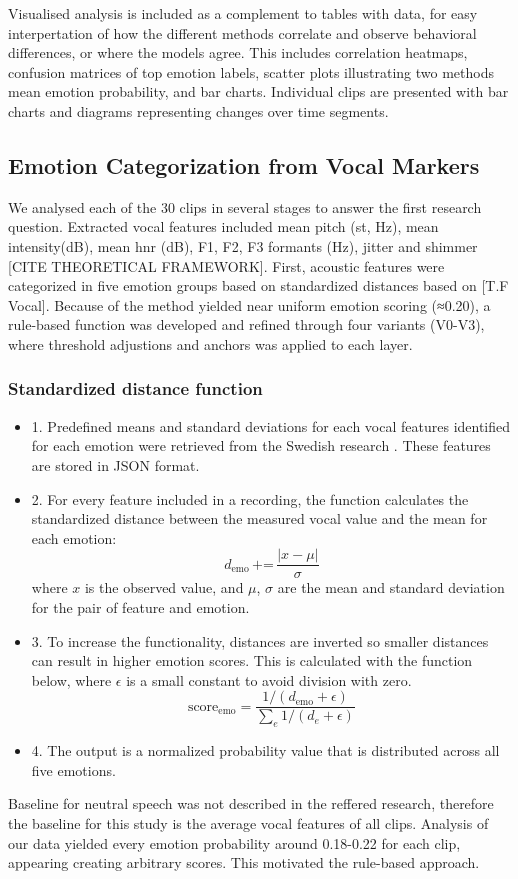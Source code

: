 Visualised analysis is included as a complement to tables with data, for easy interpertation of how the different methods correlate and observe behavioral differences, or where the models agree. 
This includes correlation heatmaps, confusion matrices of top emotion labels, scatter plots illustrating two methods mean emotion probability, and bar charts. 
Individual clips are presented with bar charts and diagrams representing changes over time segments. 



\subsection{Emotion Categorization from Vocal Markers}
We analysed each of the 30 clips in several stages to answer the first research question. Extracted vocal features included mean pitch (st, Hz), mean intensity(dB), mean hnr (dB), F1, F2, F3 formants (Hz), jitter and shimmer [CITE THEORETICAL FRAMEWORK].
First, acoustic features were categorized in five emotion groups based on standardized distances based on [T.F Vocal]. Because of the method yielded near uniform emotion scoring (≈0.20), a rule-based function was developed and refined through four variants (V0-V3), 
where threshold adjustions and anchors was applied to each layer.  

\subsubsection{Standardized distance function}
\label{sec:method-stand-func}
\begin{itemize}
    \item 1. Predefined means and standard deviations for each vocal features identified for each emotion were retrieved from the Swedish research \autocite{Ekberg2023}. These features are stored in JSON format. 
    \item 2. For every feature included in a recording, the function calculates the standardized distance between the measured vocal value and the mean for each emotion: 
    \[
    d_{\text{emo}} \, \text{+=} \, \frac{|x - \mu|}{\sigma}
    \]
    where \( x \) is the observed value, and \( \mu \), \( \sigma \) are the mean and standard deviation for the pair of feature and emotion.  
    \item 3. To increase the functionality, distances are inverted so smaller distances can result in higher emotion scores. 
    This is calculated with the function below, where \( \epsilon \) is a small constant to avoid division with zero. 
    \[
    \text{score}_{\text{emo}} = \frac{1 / (d_{\text{emo}} + \epsilon)}{\sum_{e} 1 / (d_{e} + \epsilon)}
    \]
    \item 4. The output is a normalized probability value that is distributed across all five emotions. 
\end{itemize}
Baseline for neutral speech was not described in the reffered research, therefore the baseline for this study is the average vocal features of all clips. 
Analysis of our data yielded every emotion probability around 0.18-0.22 for each clip, appearing creating arbitrary scores. This motivated the rule-based approach. 


